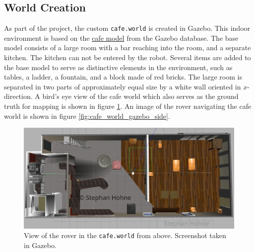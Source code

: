\documentclass[10pt, journal, compsoc]{IEEEtran}
\begin{document}
\subsection{World Creation}
\label{sec:world_creation}
As part of the project, the custom \texttt{cafe.world} is created in Gazebo. This indoor environment is based on the \href {http://models.gazebosim.org/cafe/}{cafe model} from the Gazebo database. The base model consists of a large room with a bar reaching into the room, and a separate kitchen. The kitchen can not be entered by the robot. Several items are added to the base model to serve as distinctive elements in the environment, such as tables, a ladder, a fountain, and a block made of red bricks. The large room is separated in two parts of approximately equal size by a white wall oriented in $x$-direction. A bird's eye view of the cafe world which also serves as the ground truth for mapping is shown in figure \ref{fig:cafe_world_gazebo_top}. An image of the rover navigating the cafe world is shown in figure \ref{fig:cafe_world_gazebo_side}.

\begin{figure}[thpb]
      \centering
      \includegraphics[width=\columnwidth]{images/cafe_world_gazebo.jpg}
      \caption{View of the rover in the \texttt{cafe.world} from above. Screenshot taken in Gazebo.}
      \label{fig:cafe_world_gazebo_top}
\end{figure}
\end{document}
